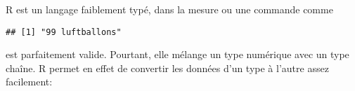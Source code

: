R est un langage faiblement typé, dans la mesure ou une commande comme

\begin{knitrout}
\color{fgcolor}\begin{kframe}
\begin{flushleft}
\ttfamily\noindent
{}\hlkeyword{(}\hlkeyword{,}{\ }\hlkeyword{,}{\ }\hlargument{=}{\ }\hlkeyword{)}\mbox{}
\normalfont
\end{flushleft}
\begin{verbatim}
## [1] "99 luftballons"
\end{verbatim}
\end{kframe}
\end{knitrout}


\noindent est parfaitement valide.
Pourtant, elle mélange un type numérique avec un type chaîne.
R permet en effet de convertir les données d'un type à l'autre assez facilement:

